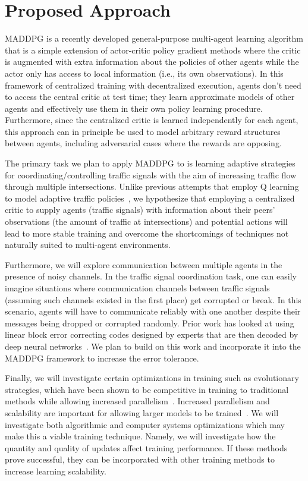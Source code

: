 
\section{Proposed Approach}
\label{sec:direction}

MADDPG is a recently developed general-purpose multi-agent learning algorithm
that is a simple extension of actor-critic policy gradient methods where the
critic is augmented with extra information about the policies of other agents
while the actor only has access to local information (i.e., its own
observations). In this framework of centralized training with decentralized
execution, agents don’t need to access the central critic at test time; they
learn approximate models of other agents and effectively use them in their own
policy learning procedure. Furthermore, since the centralized critic is
learned independently for each agent, this approach can in principle be used
to model arbitrary reward structures between agents, including adversarial
cases where the rewards are opposing.

The primary task we plan to apply MADDPG to is learning adaptive strategies
for coordinating/controlling traffic signals with the aim of increasing
traffic flow through multiple intersections. Unlike previous attempts that
employ Q learning to model adaptive traffic policies~\cite{araghi2015traffic},
we hypothesize that employing a centralized critic to supply agents (traffic
signals) with information about their peers’ observations (the amount of
traffic at intersections) and potential actions will lead to more stable
training and overcome the shortcomings of techniques not naturally suited to
multi-agent environments.

Furthermore, we will explore communication between multiple agents in the
presence of noisy channels. In the traffic signal coordination task, one can
easily imagine situations where communication channels between traffic signals
(assuming such channels existed in the first place) get corrupted or break. In
this scenario, agents will have to communicate reliably with one another
despite their messages being dropped or corrupted randomly. Prior work has
looked at using linear block error correcting codes designed by experts that
are then decoded by deep neural networks~\cite{nachmani2016learning,
nachmani2017rnn}. We plan to build on this work and incorporate it into the
MADDPG framework to increase the error tolerance.

Finally, we will investigate certain optimizations in training such as
evolutionary strategies, which have been shown to be competitive in training
to traditional methods while allowing increased
parallelism~\cite{salimans2017evolution}.
Increased parallelism and scalability are important for allowing larger models to be trained~\cite{nair2015massively}.
We will investigate both algorithmic and computer systems optimizations which may make this a viable training technique.
Namely, we will investigate how the quantity and quality of updates affect training performance.
If these methods prove successful, they can be incorporated with other training methods to increase learning scalability.



